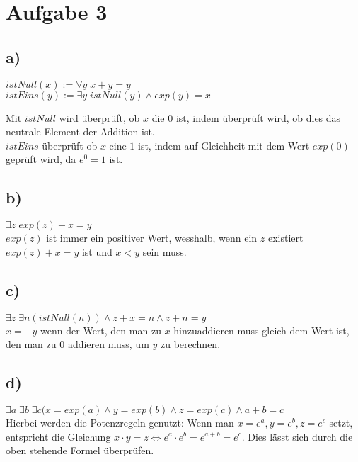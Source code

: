 \documentclass[11pt, a4paper]{article}
\newcommand{\n}{\wedge}
\begin{document}
\section*{Aufgabe 3}
\subsection*{a)}
$istNull(x) := \forall y\; x+y = y$\\
$istEins(y) := \exists y \; istNull(y) \n exp(y) = x$

Mit $istNull$ wird überprüft, ob $x$ die $0$ ist, indem überprüft wird, ob dies das neutrale Element der Addition ist.\\
$istEins$ überprüft ob $x$ eine $1$ ist, indem auf Gleichheit mit dem Wert $exp(0)$ geprüft wird, da $e^0 = 1$ ist.

\subsection*{b)}
$\exists z \; exp(z) + x = y$\\
$exp(z)$ ist immer ein positiver Wert, wesshalb, wenn ein $z$ existiert $exp(z) + x = y$ ist und $x < y$ sein muss.

\subsection*{c)}
$\exists z\; \exists n (istNull(n)) \n z+x = n \n z+n = y$\\
$x = -y$ wenn der Wert, den man zu $x$ hinzuaddieren muss gleich dem Wert ist, den man zu $0$ addieren muss, um $y$ zu berechnen.


\subsection*{d)}
$\exists a\; \exists b \; \exists c (x = exp(a) \n y = exp(b) \n z = exp(c) \n a + b = c$\\
Hierbei werden die Potenzregeln genutzt: Wenn man $x = e^a, y =e^b, z=e^c$ setzt, entspricht die Gleichung $x\cdot y = z \Leftrightarrow e^a \cdot e^b = e^{a+b} = e^c$. Dies lässt sich durch die oben stehende Formel überprüfen.
\end{document}
